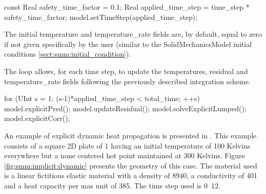 \begin{cpp}
  const Real safety_time_factor = 0.1;
  Real applied_time_step = time_step * safety_time_factor;
  model.setTimeStep(applied_time_step);
\end{cpp}

The initial temperature  and temperature\_rate fields are, by default,  equal to zero if
not given specifically by the user (similar to the SolidMechanicsModel initial conditions
\ref{sect:smm:initial_condition}).

The loop  allows, for each time  step, to update the  temperatures, residual and
temperature\_rate  fields  following the previously described integration scheme.

\begin{cpp}
  for (UInt s = 1; (s-1)*applied_time_step < total_time; ++s) {
    model.explicitPred();
    model.updateResidual();
    model.solveExplicitLumped();
    model.explicitCorr();  
  }
\end{cpp}

An    example    of    explicit     dynamic    heat propagation is    presented    in
.  This example  consists of a square 2D plate of \unit{1}{\squaremetre} 
having an initial temperature of 100 Kelvins everywhere but a none centered hot point 
maintained at 300 Kelvins. Figure \ref{fig:smm:implicit:dynamic} presents the
geometry of this case. The material used is a linear fictitious elastic material
with  a density  of  \unit{8940}{\kilogrampercubicmetre}, a  conductivity of 
\unit{401}{\watt\per\metre\per\kelvin} and a heat capacity per mas unit of \unit{385}{\joule\per\kelvin\per\kilogram}. The time step used is \unit{0.12}{\second}.

